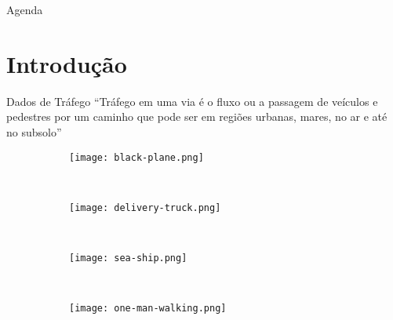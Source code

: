 



\customtitlepage

\showqrcode

\begin{frame}{Agenda}
  \overview
\end{frame}

\section{Introdução}

\begin{frame}{Dados de Tráfego}
  ``Tráfego em uma via é o fluxo ou a passagem de veículos e pedestres por um
caminho que pode ser em regiões urbanas, mares, no ar e até no subsolo''

\hfill \citep{Chen2015}

  \begin{figure}[h!]
    \centering
    \begin{subfigure}{0.20\textwidth}
      \centering
      \texttt{[image: black-plane.png]}
    \end{subfigure}
    ~
    \begin{subfigure}{0.20\textwidth}
      \centering
      \texttt{[image: delivery-truck.png]}
    \end{subfigure}
    ~
    \begin{subfigure}{0.20\textwidth}
      \centering
      \texttt{[image: sea-ship.png]}
    \end{subfigure}
    ~
    \begin{subfigure}{0.20\textwidth}
      \centering
      \texttt{[image: one-man-walking.png]}
    \end{subfigure}
  \end{figure}
\end{frame}

